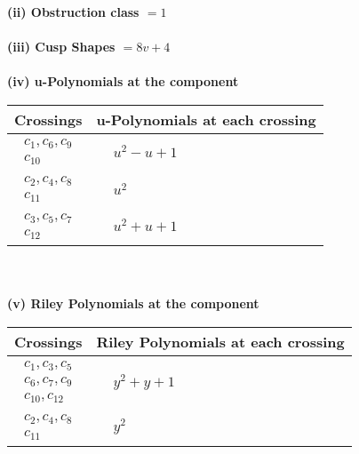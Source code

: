 \documentclass[1p]{elsarticle_modified}
\theoremstyle{definition}
\begin{document}
\flushleft \textbf{(ii) Obstruction class $= 1$}\\~\\
\flushleft \textbf{(iii) Cusp Shapes $= 8 v+4$}\\~\\
\newpage\renewcommand{\arraystretch}{1}
\flushleft \textbf{(iv) u-Polynomials at the component}\newline \\
\begin{tabular}{m{50pt}|m{274pt}}
Crossings & \hspace{64pt}u-Polynomials at each crossing \\
\hline $$\begin{aligned}c_{1},c_{6},c_{9}\\c_{10}\end{aligned}$$&$\begin{aligned}
&u^2- u+1
\end{aligned}$\\
\hline $$\begin{aligned}c_{2},c_{4},c_{8}\\c_{11}\end{aligned}$$&$\begin{aligned}
&u^2
\end{aligned}$\\
\hline $$\begin{aligned}c_{3},c_{5},c_{7}\\c_{12}\end{aligned}$$&$\begin{aligned}
&u^2+u+1
\end{aligned}$\\
\hline
\end{tabular}\\~\\
\newpage\renewcommand{\arraystretch}{1}
\flushleft \textbf{(v) Riley Polynomials at the component}\newline \\
\begin{tabular}{m{50pt}|m{274pt}}
Crossings & \hspace{64pt}Riley Polynomials at each crossing \\
\hline $$\begin{aligned}c_{1},c_{3},c_{5}\\c_{6},c_{7},c_{9}\\c_{10},c_{12}\end{aligned}$$&$\begin{aligned}
&y^2+y+1
\end{aligned}$\\
\hline $$\begin{aligned}c_{2},c_{4},c_{8}\\c_{11}\end{aligned}$$&$\begin{aligned}
&y^2
\end{aligned}$\\
\hline
\end{tabular}\\~\\
\end{document}
